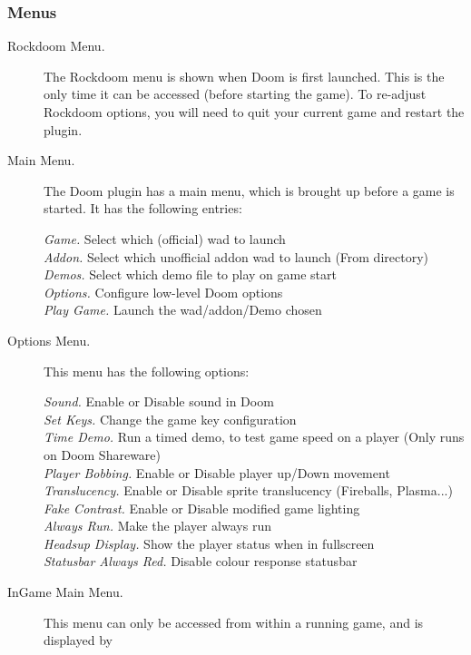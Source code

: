 \subsubsection{Menus}
\begin{description}
  \item[Rockdoom Menu. ] The Rockdoom menu is shown when Doom is first launched.  
This is the only time it can be accessed (before starting the game).  To re-adjust 
Rockdoom options, you will need to quit your current game and restart the plugin.
  \item[Main Menu. ]
  The Doom plugin has a main menu, which is brought up before a game is started. It 
  has the following entries:
  
  \emph{Game. } Select which (official) wad to launch\\
  \emph{Addon. } Select which unofficial addon wad to launch (From 
   directory)\\
  \emph{Demos. } Select which demo file to play on game start\\
  \emph{Options. } Configure low-level Doom options\\
  \emph{Play Game. } Launch the wad/addon/Demo chosen%
  
  \item[Options Menu. ]This menu has the following options:
  
  \emph{Sound. } Enable or Disable sound in Doom\\
  \emph{Set Keys. }  Change the game key configuration\\
  \emph{Time Demo. } Run a timed demo, to test game speed on a player (Only runs on Doom Shareware)\\
  \emph{Player Bobbing. } Enable or Disable player up/Down movement\\
  \emph{Translucency. } Enable or Disable sprite translucency (Fireballs, Plasma...)\\
  \emph{Fake Contrast.} Enable or Disable modified game lighting\\
  \emph{Always Run.} Make the player always run\\
  \emph{Headsup Display.} Show the player status when in fullscreen\\
  \emph{Statusbar Always Red.} Disable colour response statusbar%

  \item[InGame Main Menu. ]This menu can only be accessed from within a running game, and is displayed by


\end{description}
